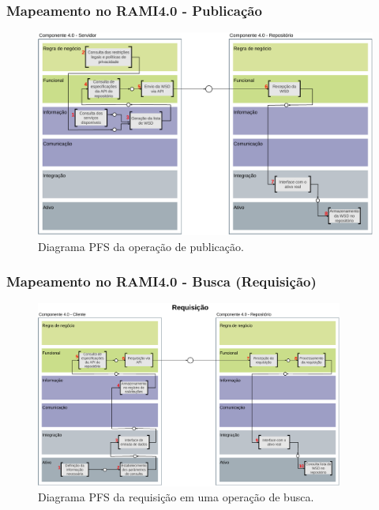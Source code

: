 \documentclass[10pt]{beamer}
\begin{document}
\begin{frame}
	\frametitle{Mapeamento no RAMI4.0 - Publicação}
	
	\begin{figure}[htb]
		\centering
		\caption{Diagrama PFS da operação de publicação.}
		\label{fig:rami-publicacao}
		\includegraphics[width=1\textwidth]{rami-publicacao}
	\end{figure}
	
\end{frame}
\begin{frame}
	\frametitle{Mapeamento no RAMI4.0 - Busca (Requisição)}
	
	\begin{figure}[htb]
		\centering
		\caption{Diagrama PFS da requisição em uma operação de busca.}
		\label{fig:rami-busca-requisicao}
		\includegraphics[width=0.9\textwidth]{rami-busca-requisicao}

	\end{figure}
	
\end{frame}
\end{document}
